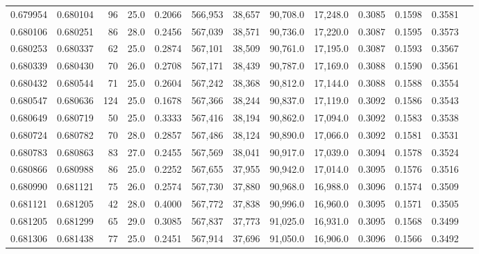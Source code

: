 \begin{tabular}{rrrrrrrrrrrrr}
0.679954 & 0.680104 &    96 & 25.0 &                                     0.2066 & 566,953 &  38,657 &  90,708.0 &  17,248.0 & 0.3085 & 0.1598 & 0.3581 \\
0.680106 & 0.680251 &    86 & 28.0 &                                     0.2456 & 567,039 &  38,571 &  90,736.0 &  17,220.0 & 0.3087 & 0.1595 & 0.3573 \\
0.680253 & 0.680337 &    62 & 25.0 &                                     0.2874 & 567,101 &  38,509 &  90,761.0 &  17,195.0 & 0.3087 & 0.1593 & 0.3567 \\
0.680339 & 0.680430 &    70 & 26.0 &                                     0.2708 & 567,171 &  38,439 &  90,787.0 &  17,169.0 & 0.3088 & 0.1590 & 0.3561 \\
0.680432 & 0.680544 &    71 & 25.0 &                                     0.2604 & 567,242 &  38,368 &  90,812.0 &  17,144.0 & 0.3088 & 0.1588 & 0.3554 \\
0.680547 & 0.680636 &   124 & 25.0 &                                     0.1678 & 567,366 &  38,244 &  90,837.0 &  17,119.0 & 0.3092 & 0.1586 & 0.3543 \\
0.680649 & 0.680719 &    50 & 25.0 &                                     0.3333 & 567,416 &  38,194 &  90,862.0 &  17,094.0 & 0.3092 & 0.1583 & 0.3538 \\
0.680724 & 0.680782 &    70 & 28.0 &                                     0.2857 & 567,486 &  38,124 &  90,890.0 &  17,066.0 & 0.3092 & 0.1581 & 0.3531 \\
0.680783 & 0.680863 &    83 & 27.0 &                                     0.2455 & 567,569 &  38,041 &  90,917.0 &  17,039.0 & 0.3094 & 0.1578 & 0.3524 \\
0.680866 & 0.680988 &    86 & 25.0 &                                     0.2252 & 567,655 &  37,955 &  90,942.0 &  17,014.0 & 0.3095 & 0.1576 & 0.3516 \\
0.680990 & 0.681121 &    75 & 26.0 &                                     0.2574 & 567,730 &  37,880 &  90,968.0 &  16,988.0 & 0.3096 & 0.1574 & 0.3509 \\
0.681121 & 0.681205 &    42 & 28.0 &                                     0.4000 & 567,772 &  37,838 &  90,996.0 &  16,960.0 & 0.3095 & 0.1571 & 0.3505 \\
0.681205 & 0.681299 &    65 & 29.0 &                                     0.3085 & 567,837 &  37,773 &  91,025.0 &  16,931.0 & 0.3095 & 0.1568 & 0.3499 \\
0.681306 & 0.681438 &    77 & 25.0 &                                     0.2451 & 567,914 &  37,696 &  91,050.0 &  16,906.0 & 0.3096 & 0.1566 & 0.3492 \\

\end{tabular}
